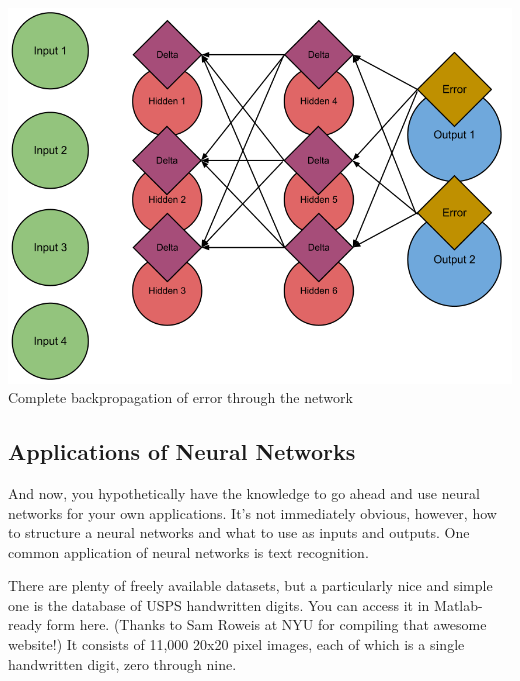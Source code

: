 \documentclass{article}
\begin{document}
\begin{center}
    \includegraphics[scale=0.5]{images/backprop-3.png} \\
    Complete backpropagation of error through the network
\end{center}

\subsection*{Applications of Neural Networks}

And now, you hypothetically have the knowledge to go ahead and use neural networks for your own
applications. It's not immediately obvious, however, how to structure a neural networks and what to
use as inputs and outputs. One common application of neural networks is text recognition.

There are plenty of freely available datasets, but a particularly nice and simple one is the
database of USPS handwritten digits. You can access it in Matlab-ready form here. (Thanks to Sam
Roweis at NYU for compiling that awesome website!) It consists of 11,000 20x20 pixel images, each of
which is a single handwritten digit, zero through nine.
\end{document}
